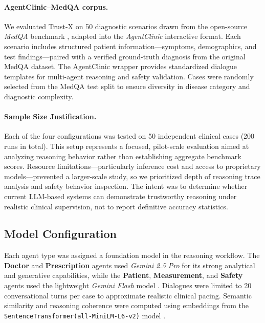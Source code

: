 \documentclass[letterpaper]{article} %
\begin{document}
\paragraph{AgentClinic–MedQA corpus.}
We evaluated Trust-X on 50 diagnostic scenarios drawn from the open-source \textit{MedQA} benchmark \cite{jin2021disease}, adapted into the \textit{AgentClinic} interactive format.  
Each scenario includes structured patient information—symptoms, demographics, and test findings—paired with a verified ground-truth diagnosis from the original MedQA dataset.  
The AgentClinic wrapper provides standardized dialogue templates for multi-agent reasoning and safety validation.  
Cases were randomly selected from the MedQA test split to ensure diversity in disease category and diagnostic complexity.

\paragraph{Sample Size Justification.}
Each of the four configurations was tested on 50 independent clinical cases (200 runs in total).  
This setup represents a focused, pilot-scale evaluation aimed at analyzing reasoning behavior rather than establishing aggregate benchmark scores.  
Resource limitations—particularly inference cost and access to proprietary models—prevented a larger-scale study, so we prioritized depth of reasoning trace analysis and safety behavior inspection.  
The intent was to determine whether current LLM-based systems can demonstrate trustworthy reasoning under realistic clinical supervision, not to report definitive accuracy statistics.

\subsection{Model Configuration}
Each agent type was assigned a foundation model in the reasoning workflow.  
The \textbf{Doctor} and \textbf{Prescription} agents used \textit{Gemini 2.5 Pro} \cite{gemini2024} for its strong analytical and generative capabilities,  
while the \textbf{Patient}, \textbf{Measurement}, and \textbf{Safety} agents used the lightweight \textit{Gemini Flash} model \cite{geminiFlash2024}.  
Dialogues were limited to 20 conversational turns per case to approximate realistic clinical pacing.  
Semantic similarity and reasoning coherence were computed using embeddings from the \texttt{SentenceTransformer(all-MiniLM-L6-v2)} model \cite{reimers2019sentencebert}.
\end{document}
